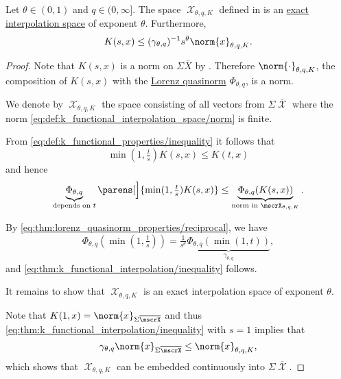 \begin{theorem}\label{thm:k_functional_interpolation}
  Let \( \theta \in (0, 1) \) and \( q \in (0, \infty] \). The space \( \mscrX_{\theta,q,K} \) defined in  is an \hyperref[def:banach_interpolation_space_exponent]{exact interpolation space} of exponent \( \theta \). Furthermore,
  \begin{equation}\label{eq:thm:k_functional_interpolation/inequality}
    K(s, x) \leq (\gamma_{\theta,q})^{-1} s^\theta \norm{x}_{\theta,q,K}.
  \end{equation}
\end{theorem}
\begin{proof}
  Note that \( K(s, x) \) is a norm on \( \Sigma \overline{X} \) by . Therefore \( \norm{\cdot}_{\theta,q,K} \), the composition of \( K(s, x) \) with the \hyperref[def:lorenz_quasinorm]{Lorenz quasinorm} \( \Phi_{\theta,q} \), is a norm.

  We denote by \( \mscrX_{\theta,q,K} \) the space consisting of all vectors from \( \Sigma \overline{\mscrX} \) where the norm \eqref{eq:def:k_functional_interpolation_space/norm} is finite.

  From \eqref{eq:def:k_functional_properties/inequality} it follows that
  \begin{equation*}
    \min(1, \tfrac t s) K(s, x) \leq K(t, x)
  \end{equation*}
  and hence
  \begin{equation*}
    \underbrace{\Phi_{\theta,q}}_{\text{depends on } t} \parens[\Big]{ \min(1, \tfrac t s) K(s, x) } \leq \underbrace{\Phi_{\theta,q}(K(s, x))}_{\text{norm in } \mscrX_{\theta,q,K}}.
  \end{equation*}

  By \eqref{eq:thm:lorenz_quasinorm_properties/reciprocal}, we have
  \begin{equation*}
    \Phi_{\theta,q}(\min(1, \tfrac t s)) = \tfrac 1 {s^\theta} \underbrace{\Phi_{\theta,q}(\min(1, t))}_{\hyperref[eq:def:lorenz_quasinorm/gamma]{\gamma_{\theta,q}}},
  \end{equation*}
  and \eqref{eq:thm:k_functional_interpolation/inequality} follows.

  It remains to show that \( \mscrX_{\theta,q,K} \) is an exact interpolation space of exponent \( \theta \).

  Note that \( K(1, x) = \norm{x}_{\Sigma \overline{\mscrX}} \) and thus \eqref{eq:thm:k_functional_interpolation/inequality} with \( s = 1 \) implies that
  \begin{equation*}
    \gamma_{\theta,q} \norm{x}_{\Sigma \overline{\mscrX}} \leq \norm{x}_{\theta,q,K},
  \end{equation*}
  which shows that \( \mscrX_{\theta,q,K} \) can be embedded continuously into \( \Sigma \overline{\mscrX} \).


\end{proof}
